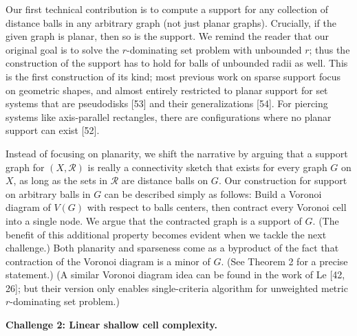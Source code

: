 \par
\par
Our first technical contribution is to compute a support for any collection of distance balls in any arbitrary graph (not just planar graphs). Crucially, if the given graph is planar, then so is the support. We remind the reader that our original goal is to solve the $r$-dominating set problem with unbounded $r$; thus the construction of the support has to hold for balls of unbounded radii as well. This is the first construction of its kind; most previous work on sparse support focus on geometric shapes, and almost entirely restricted to planar support for set systems that are pseudodisks [53] and their generalizations [54]. For piercing systems like axis-parallel rectangles, there are configurations where no planar support can exist [52].
\par
\par
Instead of focusing on planarity, we shift the narrative by arguing that a support graph for $(X,\mathcal{R})$ is really a connectivity sketch that exists for every graph $G$ on $X$, as long as the sets in $\mathcal{R}$ are distance balls on $G$. Our construction for support on arbitrary balls in $G$ can be described simply as follows: Build a Voronoi diagram of $V(G)$ with respect to balls centers, then contract every Voronoi cell into a single node. We argue that the contracted graph is a support of $G$. (The benefit of this additional property becomes evident when we tackle the next challenge.) Both planarity and sparseness come as a byproduct of the fact that contraction of the Voronoi diagram is a minor of $G$. (See Theorem 2 for a precise statement.) (A similar Voronoi diagram idea can be found in the work of Le [42, 26]; but their version only enables single-criteria algorithm for unweighted metric $r$-dominating set problem.)
\par
\par
\par\medskip\noindent\textbf{Challenge 2: Linear shallow cell complexity.}\par
